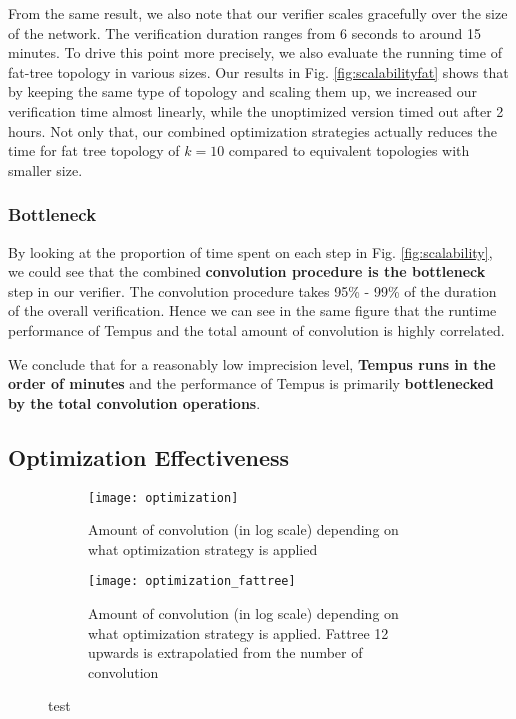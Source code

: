 From the same result, we also note that our verifier scales gracefully over the size of the network.
The verification duration ranges from 6 seconds to around 15 minutes. 
To drive this point more precisely, we also evaluate the running time of fat-tree topology in various sizes.
Our results in Fig. \ref{fig:scalabilityfat} shows that by keeping the same type of topology and scaling them up, we increased 
our verification time almost linearly, while the unoptimized version timed out after 2 hours.
Not only that, our combined optimization strategies actually reduces the time for fat tree topology of $k=10$ compared to 
equivalent topologies with smaller size.

\subsubsection{Bottleneck}
By looking at the proportion of time spent on each step in Fig. \ref{fig:scalability}, we could see that 
the combined \textbf{convolution procedure is the bottleneck} step in our verifier.
The convolution procedure takes 95\% - 99\% of the duration of the overall verification.
Hence we can see in the same figure that the runtime performance of Tempus and the total amount 
of convolution is highly correlated.

We conclude that for a reasonably low imprecision level, \textbf{Tempus runs in the order of 
minutes} and the performance of Tempus is primarily \textbf{bottlenecked by the total convolution 
operations}.

\subsection{Optimization Effectiveness}

\begin{figure}[h]
    \centering
    \begin{subfigure}[b]{\columnwidth}
        \centering
        \texttt{[image: optimization]}
        \caption{Amount of convolution (in log scale) depending on what optimization strategy is applied}
        \label{fig:opt}
    \end{subfigure}
    \vfill
    \begin{subfigure}[b]{\columnwidth}
        \centering
        \texttt{[image: optimization\_fattree]}
        \caption{Amount of convolution (in log scale) depending on what optimization strategy is applied. 
            Fattree 12 upwards is extrapolatied from the number of convolution}
        \label{fig:opt_fat}
    \end{subfigure}
    \caption{test}
\end{figure}


